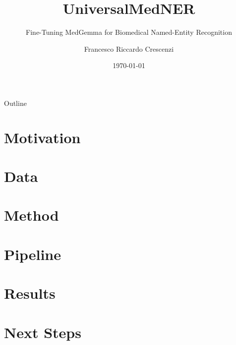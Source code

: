 \documentclass[11pt]{beamer}
\title{UniversalMedNER}
\subtitle{Fine-Tuning MedGemma for Biomedical Named-Entity Recognition}
\author{Francesco Riccardo Crescenzi}
\date{\today}
\begin{document}
\frame{\titlepage}

\begin{frame}{Outline}
  \tableofcontents
\end{frame}

\section{Motivation}


\section{Data}


\section{Method}


\section{Pipeline}


\section{Results}


\section{Next Steps}

\end{document}
